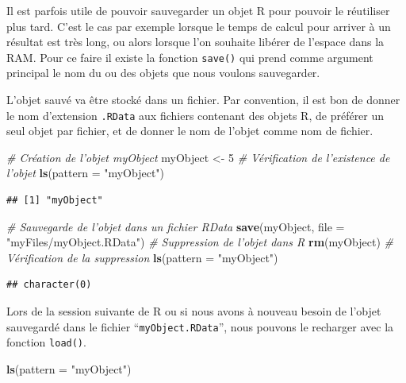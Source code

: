 \documentclass[
]{book}
\newenvironment{Shaded}{\begin{snugshade}}{\end{snugshade}}
\newcommand{\CommentTok}[1]{\textcolor[rgb]{0.56,0.35,0.01}{\textit{#1}}}
\newcommand{\DataTypeTok}[1]{\textcolor[rgb]{0.13,0.29,0.53}{#1}}
\newcommand{\DecValTok}[1]{\textcolor[rgb]{0.00,0.00,0.81}{#1}}
\newcommand{\KeywordTok}[1]{\textcolor[rgb]{0.13,0.29,0.53}{\textbf{#1}}}
\newcommand{\NormalTok}[1]{#1}
\newcommand{\StringTok}[1]{\textcolor[rgb]{0.31,0.60,0.02}{#1}}
\begin{document}
Il est parfois utile de pouvoir sauvegarder un objet R pour pouvoir le réutiliser plus tard. C'est le cas par exemple lorsque le temps de calcul pour arriver à un résultat est très long, ou alors lorsque l'on souhaite libérer de l'espace dans la RAM. Pour ce faire il existe la fonction \texttt{save()} qui prend comme argument principal le nom du ou des objets que nous voulons sauvegarder.

L'objet sauvé va être stocké dans un fichier. Par convention, il est bon de donner le nom d'extension \texttt{.RData} aux fichiers contenant des objets R, de préférer un seul objet par fichier, et de donner le nom de l'objet comme nom de fichier.

\begin{Shaded}
\begin{Highlighting}[]
\CommentTok{# Création de l'objet myObject}
\NormalTok{myObject <-}\StringTok{ }\DecValTok{5}
\CommentTok{# Vérification de l'existence de l'objet}
\KeywordTok{ls}\NormalTok{(}\DataTypeTok{pattern =} \StringTok{"myObject"}\NormalTok{)}
\end{Highlighting}
\end{Shaded}

\begin{verbatim}
## [1] "myObject"
\end{verbatim}

\begin{Shaded}
\begin{Highlighting}[]
\CommentTok{# Sauvegarde de l'objet dans un fichier RData}
\KeywordTok{save}\NormalTok{(myObject, }\DataTypeTok{file =} \StringTok{"myFiles/myObject.RData"}\NormalTok{)}
\CommentTok{# Suppression de l'objet dans R}
\KeywordTok{rm}\NormalTok{(myObject)}
\CommentTok{# Vérification de la suppression}
\KeywordTok{ls}\NormalTok{(}\DataTypeTok{pattern =} \StringTok{"myObject"}\NormalTok{)}
\end{Highlighting}
\end{Shaded}

\begin{verbatim}
## character(0)
\end{verbatim}

Lors de la session suivante de R ou si nous avons à nouveau besoin de l'objet sauvegardé dans le fichier ``\texttt{myObject.RData}'', nous pouvons le recharger avec la fonction \texttt{load()}.

\begin{Shaded}
\begin{Highlighting}[]
\KeywordTok{ls}\NormalTok{(}\DataTypeTok{pattern =} \StringTok{"myObject"}\NormalTok{)}
\end{Highlighting}
\end{Shaded}
\end{document}

